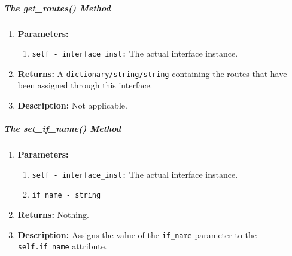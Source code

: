         \subparagraph{The get\_routes() Method}
            \begin{enumerate}
                \item \textbf{Parameters:}
                \begin{enumerate}
                    \item \texttt{self - interface\_inst:} The actual interface instance.
                \end{enumerate}
                \item \textbf{Returns:} A \texttt{dictionary/string/string} containing the routes that have been assigned through this interface.
                \item \textbf{Description:} Not applicable.
            \end{enumerate}

        \subparagraph{The set\_if\_name() Method}
            \begin{enumerate}
                \item \textbf{Parameters:}
                \begin{enumerate}
                    \item \texttt{self - interface\_inst:} The actual interface instance.
                    \item \texttt{if\_name - string}
                \end{enumerate}
                \item \textbf{Returns:} Nothing.
                \item \textbf{Description:} Assigns the value of the \texttt{if\_name} parameter to the \texttt{self.if\_name} attribute.
            \end{enumerate}

